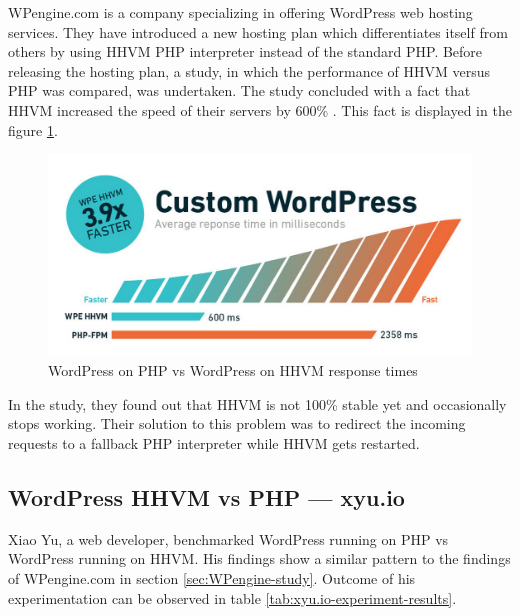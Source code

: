 WPengine.com is a company specializing in offering WordPress web hosting services. They have introduced a new hosting plan which differentiates itself from others by using HHVM PHP interpreter instead of the standard PHP. Before releasing the hosting plan, a study, in which the performance of HHVM versus PHP was compared, was undertaken. The study concluded with a fact that HHVM increased the speed of their servers by 600\% \cite{Study:Perf-WPEngine}. This fact is displayed in the figure \ref{fig:wpengine-hhvm-php-wordpress}.

\begin{figure}[H]
\begin{center}
\includegraphics[scale=0.5]{figures/wpengine-hhvm-php-wordpress.png}
\caption{WordPress on PHP vs WordPress on HHVM response times}
\label{fig:wpengine-hhvm-php-wordpress}
\end{center}
\end{figure}

In the study, they found out that HHVM is not 100\% stable yet and occasionally stops working. Their solution to this problem was to redirect the incoming requests to a fallback PHP interpreter while HHVM gets restarted. 

\subsection{WordPress HHVM vs PHP — xyu.io}

Xiao Yu, a web developer, benchmarked \cite{Study:Perf-XYU.io} WordPress running on PHP vs WordPress running on HHVM. His findings show a similar pattern to the findings of WPengine.com in section \ref{sec:WPengine-study}. Outcome of his experimentation can be observed in table \ref{tab:xyu.io-experiment-results}. 

